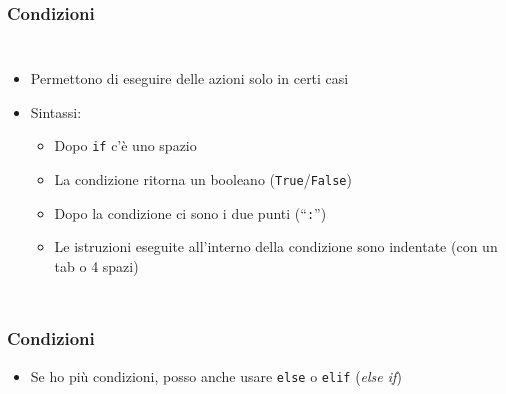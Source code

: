 \begin{contentframe}
    \frametitle{Condizioni}

    \begin{columns}
        \begin{itemize}
            \item Permettono di eseguire delle azioni solo in certi casi
    
            \bigskip
            \item Sintassi:
            \begin{itemize}
                \item Dopo \texttt{if} c'è uno spazio
                \item La condizione ritorna un booleano (\texttt{True}/\texttt{False})
                \item Dopo la condizione ci sono i due punti (``\texttt{:}'')
                \item Le istruzioni eseguite all’interno della condizione sono indentate (con un tab o 4 spazi)
            \end{itemize}
        \end{itemize}
        
        \centering
    \end{columns}
\end{contentframe}

\begin{contentframe}
    \frametitle{Condizioni}

    \begin{itemize}
        \item Se ho più condizioni, posso anche usare \texttt{else} o \texttt{elif} (\textit{else if})
    \end{itemize}

    \bigskip
    \centering
    
\end{contentframe}

